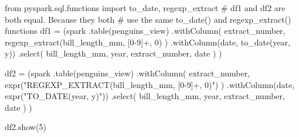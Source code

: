 \documentclass[
  11pt,
  letterpaper,
  DIV=11,
  numbers=noendperiod]{scrreprt}
\newenvironment{Shaded}{\begin{snugshade}}{\end{snugshade}}
\newcommand{\CommentTok}[1]{\textcolor[rgb]{0.37,0.37,0.37}{#1}}
\newcommand{\DecValTok}[1]{\textcolor[rgb]{0.68,0.00,0.00}{#1}}
\newcommand{\ImportTok}[1]{\textcolor[rgb]{0.00,0.46,0.62}{#1}}
\newcommand{\NormalTok}[1]{\textcolor[rgb]{0.00,0.23,0.31}{#1}}
\newcommand{\OperatorTok}[1]{\textcolor[rgb]{0.37,0.37,0.37}{#1}}
\newcommand{\StringTok}[1]{\textcolor[rgb]{0.13,0.47,0.30}{#1}}
\begin{document}
\begin{Shaded}
\begin{Highlighting}[]
\ImportTok{from}\NormalTok{ pyspark.sql.functions }\ImportTok{import}\NormalTok{ to\_date, regexp\_extract}
\CommentTok{\# \textasciigrave{}df1\textasciigrave{} and \textasciigrave{}df2\textasciigrave{} are both equal. Because they both}
\CommentTok{\# use the same \textasciigrave{}to\_date()\textasciigrave{} and \textasciigrave{}regexp\_extract()\textasciigrave{} functions}
\NormalTok{df1 }\OperatorTok{=}\NormalTok{ (spark}
\NormalTok{  .table(}\StringTok{\textquotesingle{}penguins\_view\textquotesingle{}}\NormalTok{)}
\NormalTok{  .withColumn(}
    \StringTok{\textquotesingle{}extract\_number\textquotesingle{}}\NormalTok{,}
\NormalTok{    regexp\_extract(}\StringTok{\textquotesingle{}bill\_length\_mm\textquotesingle{}}\NormalTok{, }\StringTok{\textquotesingle{}[0{-}9]+\textquotesingle{}}\NormalTok{, }\DecValTok{0}\NormalTok{)}
\NormalTok{  )}
\NormalTok{  .withColumn(}\StringTok{\textquotesingle{}date\textquotesingle{}}\NormalTok{, to\_date(}\StringTok{\textquotesingle{}year\textquotesingle{}}\NormalTok{, }\StringTok{\textquotesingle{}y\textquotesingle{}}\NormalTok{))}
\NormalTok{  .select(}
    \StringTok{\textquotesingle{}bill\_length\_mm\textquotesingle{}}\NormalTok{, }\StringTok{\textquotesingle{}year\textquotesingle{}}\NormalTok{,}
    \StringTok{\textquotesingle{}extract\_number\textquotesingle{}}\NormalTok{, }\StringTok{\textquotesingle{}date\textquotesingle{}}
\NormalTok{  )}
\NormalTok{)}

\NormalTok{df2 }\OperatorTok{=}\NormalTok{ (spark}
\NormalTok{  .table(}\StringTok{\textquotesingle{}penguins\_view\textquotesingle{}}\NormalTok{)}
\NormalTok{  .withColumn(}
    \StringTok{\textquotesingle{}extract\_number\textquotesingle{}}\NormalTok{,}
\NormalTok{    expr(}\StringTok{"REGEXP\_EXTRACT(bill\_length\_mm, \textquotesingle{}[0{-}9]+\textquotesingle{}, 0)"}\NormalTok{)}
\NormalTok{  )}
\NormalTok{  .withColumn(}\StringTok{\textquotesingle{}date\textquotesingle{}}\NormalTok{, expr(}\StringTok{"TO\_DATE(year, \textquotesingle{}y\textquotesingle{})"}\NormalTok{))}
\NormalTok{  .select(}
    \StringTok{\textquotesingle{}bill\_length\_mm\textquotesingle{}}\NormalTok{, }\StringTok{\textquotesingle{}year\textquotesingle{}}\NormalTok{,}
    \StringTok{\textquotesingle{}extract\_number\textquotesingle{}}\NormalTok{, }\StringTok{\textquotesingle{}date\textquotesingle{}}
\NormalTok{  )}
\NormalTok{)}

\NormalTok{df2.show(}\DecValTok{5}\NormalTok{)}
\end{Highlighting}
\end{Shaded}
\end{document}
